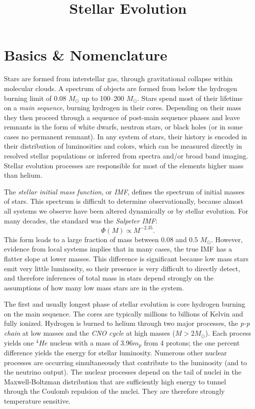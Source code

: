 \title{\bf Stellar Evolution}

\section{Basics \& Nomenclature}

Stars are formed from interstellar gas, through gravitational collapse
within molecular clouds. A spectrum of objects are formed from below
the hydrogen burning limit of 0.08 $M_\odot$ up to 100--200
$M_\odot$. Stars spend most of their lifetime on a {\it main
sequence}, burning hydrogen in their cores. Depending on their mass
they then proceed through a sequence of post-main sequence phases and
leave remnants in the form of white dwarfs, neutron stars, or black
holes (or in some cases no permanent remnant). In any system of stars,
their history is encoded in their distribution of luminosities and
colors, which can be measured directly in resolved stellar populations
or inferred from spectra and/or broad band imaging. Stellar evolution
processes are responsible for most of the elements higher mass than
helium.

The {\it stellar initial mass function}, or {\it IMF}, defines the
spectrum of initial masses of stars. This spectrum is difficult to
determine observationally, because almost all systems we observe have
been altered dynamically or by stellar evolution. For many decades,
the standard was the {\it Salpeter IMF}:
\begin{equation}
\Phi(M) \propto M^{-2.35}.
\end{equation}
This form leads to a large fraction of mass between $0.08$ and $0.5$
$M_\odot$. However, evidence from local systems implies that in many
cases, the true IMF has a flatter slope at lower masses. This
difference is significant because low mass stars emit very little
luminosity, so their presence is very difficult to directly detect,
and therefore inferences of total mass in stars depend strongly on the
assumptions of how many low mass stars are in the system.

The first and usually longest phase of stellar evolution is core
hydrogen burning on the main sequence. The cores are typically
millions to billions of Kelvin and fully ionized. Hydrogen is burned
to helium through two major processes, the {\it p-p chain} at low
masses and the {\it CNO cycle} at high masses ($M>2 M_\odot$). Each
process yields one ${}^4He$ nucleus with a mass of 3.96$m_p$ from 4
protons; the one percent difference yields the energy for stellar
luminosity. Numerous other nuclear processes are occurring
simultaneously that contribute to the luminosity (and to the neutrino
output). The nuclear processes depend on the tail of nuclei in the
Maxwell-Boltzman distribution that are sufficiently high energy to
tunnel through the Coulomb repulsion of the nuclei. They are therefore
strongly temperature sensitive.

